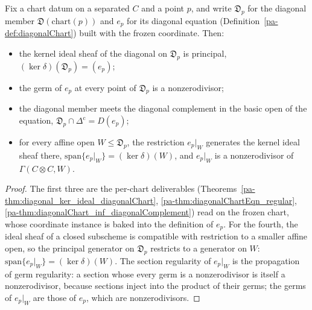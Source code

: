 \begin{theorem}
  \label{pa-thm:diagonalChartData_equation}
  \leanok

  Fix a chart datum on a separated \(C\) and a point \(p\), and write \(\mathfrak D_p\) for the
  diagonal member \(\mathfrak D(\mathrm{chart}(p))\) and \(e_p\) for its diagonal equation
  (Definition~\ref{pa-def:diagonalChart}) built with the frozen coordinate. Then:
  \begin{itemize}
    \item the kernel ideal sheaf of the diagonal on \(\mathfrak D_p\) is principal, \((\ker
      \delta)(\mathfrak D_p) = (e_p)\);
    \item the germ of \(e_p\) at every point of \(\mathfrak D_p\) is a nonzerodivisor;
    \item the diagonal member meets the diagonal complement in the basic open of the equation,
      \(\mathfrak D_p \cap \Delta^{\mathrm c} = D(e_p)\);
    \item for every affine open \(W \le \mathfrak D_p\), the restriction \(e_p|_W\) generates the
      kernel ideal sheaf there, \(\mathrm{span}\{e_p|_W\} = (\ker \delta)(W)\), and \(e_p|_W\) is a
      nonzerodivisor of \(\Gamma(C \otimes C, W)\).
  \end{itemize}
\end{theorem}
\begin{proof}
  \leanok
  The first three are the per-chart deliverables (Theorems~\ref{pa-thm:diagonal_ker_ideal_diagonalChart},
  \ref{pa-thm:diagonalChartEqn_regular}, \ref{pa-thm:diagonalChart_inf_diagonalComplement}) read on the
  frozen chart, whose coordinate instance is baked into the definition of \(e_p\). For the fourth,
  the ideal sheaf of a closed subscheme is compatible with restriction to a smaller affine open, so
  the principal generator on \(\mathfrak D_p\) restricts to a generator on \(W\): \(\mathrm{span}\{e_p|_W\}
  = (\ker \delta)(W)\). The section regularity of \(e_p|_W\) is the propagation of germ regularity:
  a section whose every germ is a nonzerodivisor is itself a nonzerodivisor, because sections inject
  into the product of their germs; the germs of \(e_p|_W\) are those of \(e_p\), which are
  nonzerodivisors.
\end{proof}


